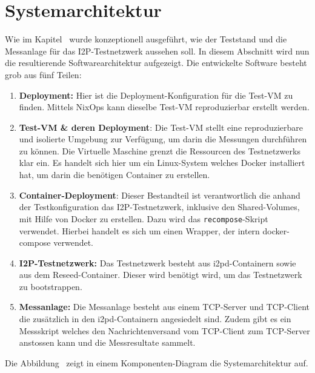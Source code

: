 \section{Systemarchitektur}\label{sec:systemarchitektur}

Wie im Kapitel~ wurde konzeptionell ausgeführt, wie der Teststand und die Messanlage für das I2P-Testnetzwerk aussehen soll.
In diesem Abschnitt wird nun die resultierende Softwarearchitektur aufgezeigt.
Die entwickelte Software besteht grob aus fünf Teilen:

\begin{enumerate}
    \item \textbf{Deployment:} Hier ist die Deployment-Konfiguration für die Test-VM zu finden. Mittels NixOps kann dieselbe Test-VM reproduzierbar erstellt werden.
    \item \textbf{Test-VM \& deren Deployment}: Die Test-VM stellt eine reproduzierbare und isolierte Umgebung zur Verfügung, um darin die Messungen durchführen zu können.
     Die Virtuelle Maschine grenzt die Ressourcen des Testnetzwerks klar ein.
     Es handelt sich hier um ein Linux-System welches Docker installiert hat,
	 um darin die benötigen Container zu erstellen.
    \item \textbf{Container-Deployment}: Dieser Bestandteil ist verantwortlich die anhand der Testkonfiguration das I2P-Testnetzwerk, inklusive den Shared-Volumes, mit Hilfe von Docker zu erstellen. Dazu wird das \lstinline|recompose|-Skript verwendet.
	 Hierbei handelt es sich um einen Wrapper, der intern docker-compose verwendet.
    \item \textbf{I2P-Testnetzwerk:} Das Testnetzwerk besteht aus i2pd-Containern sowie aus dem Reseed-Container. Dieser wird benötigt wird, um das Testnetzwerk zu bootstrappen.
    \item \textbf{Messanlage:} Die Messanlage besteht aus einem TCP-Server und TCP-Client die zusätzlich in den i2pd-Containern angesiedelt sind.
        Zudem gibt es ein Messskript welches den Nachrichtenversand vom TCP-Client zum TCP-Server anstossen kann und die Messresultate sammelt.
\end{enumerate}

Die Abbildung~ zeigt in einem Komponenten-Diagram die Systemarchitektur auf.

